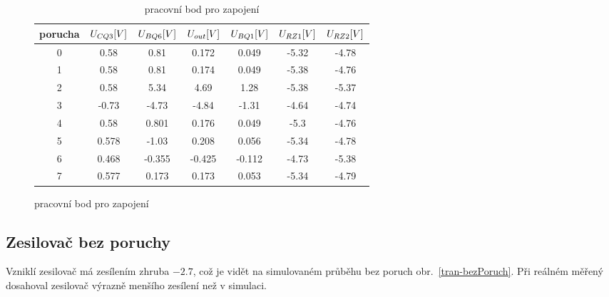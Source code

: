 \documentclass{article}
\newcommand \obr[1]
{ obr.~\ref{#1}}
\begin{document}
\begin{figure}[H]
  \begin{minipage}[t]{\textwidth}
    \begin{table}[H]
      \centering
      \vspace{-10mm}
      \begin{tabular}{|c|c|c|c|c|c|c|}
      \hline
      porucha	& \(U_{CQ3}\-[V]\)	& \(U_{BQ6}\-[V]\)	& \(U_{out}\-[V]\)	& \(U_{BQ1}\-[V]\)	& \(U_{RZ1}\-[V]\)	& \(U_{RZ2}\-[V]\) \\ \hline
      0	      & 0.58	            & 0.81	            & 0.172	            & 0.049	            & -5.32	            & -4.78            \\ \hline
      1	      & 0.58	            & 0.81	            & 0.174	            & 0.049	            & -5.38	            & -4.76            \\ \hline
      2	      & 0.58	            & 5.34	            & 4.69	            & 1.28	            & -5.38	            & -5.37            \\ \hline
      3	      & -0.73	            & -4.73	            & -4.84	            & -1.31	            & -4.64	            & -4.74            \\ \hline
      4	      & 0.58	            & 0.801	            & 0.176	            & 0.049	            & -5.3	            & -4.76            \\ \hline
      5	      & 0.578	            & -1.03	            & 0.208	            & 0.056	            & -5.34	            & -4.78            \\ \hline
      6	      & 0.468	            & -0.355	          & -0.425	          & -0.112	          & -4.73	            & -5.38            \\ \hline
      7	      & 0.577	            & 0.173	            & 0.173	            & 0.053	            & -5.34	            & -4.79            \\ \hline      
      \end{tabular}
      \caption{\label{pracovni_bod} pracovní bod pro zapojení }
    \end{table}
  \end{minipage}
\end{figure}

\subsection*{Zesilovač bez poruchy}

Vzniklí zesilovač má zesílením zhruba \(-2.7\), což je vidět na simulovaném průběhu bez poruch \obr{tran-bezPoruch}.
Při reálném měřený dosahoval zesilovač výrazně menšího zesílení než v simulaci.
\end{document}
